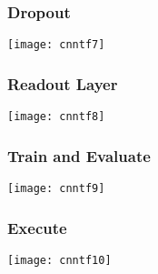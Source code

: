 \begin{frame}[fragile] \frametitle{Dropout}

\begin{center}
\texttt{[image: cnntf7]}
\end{center}
\end{frame}

\begin{frame}[fragile] \frametitle{Readout Layer}

\begin{center}
\texttt{[image: cnntf8]}
\end{center}
\end{frame}

\begin{frame}[fragile] \frametitle{Train and Evaluate}

\begin{center}
\texttt{[image: cnntf9]}
\end{center}
\end{frame}


\begin{frame}[fragile] \frametitle{Execute}

\begin{center}
\texttt{[image: cnntf10]}
\end{center}
\end{frame}
